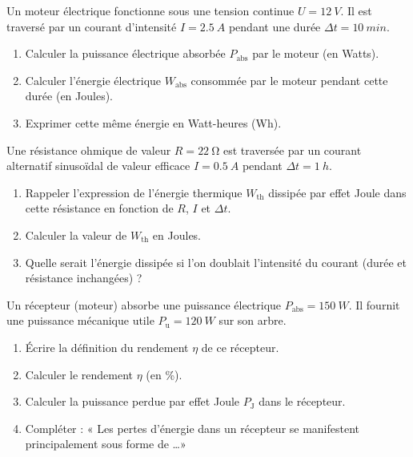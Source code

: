 \documentclass[11pt]{article}
\begin{document}
\begin{exercice}
Un moteur électrique fonctionne sous une tension continue $U = \SI{12}{V}$. Il est traversé par un courant d'intensité $I = \SI{2,5}{A}$ pendant une durée $\Delta t = \SI{10}{min}$.
\begin{enumerate}
    \item Calculer la puissance électrique absorbée $P_{\text{abs}}$ par le moteur (en Watts).
    \item Calculer l'énergie électrique $W_{\text{abs}}$ consommée par le moteur pendant cette durée (en Joules).
    \item Exprimer cette même énergie en Watt-heures (Wh).
\end{enumerate}
\end{exercice}

\begin{exercice}
Une résistance ohmique de valeur $R = \SI{22}{\ohm}$ est traversée par un courant alternatif sinusoïdal de valeur efficace $I = \SI{0,5}{A}$ pendant $\Delta t = \SI{1}{h}$.
\begin{enumerate}
    \item Rappeler l'expression de l'énergie thermique $W_{\text{th}}$ dissipée par effet Joule dans cette résistance en fonction de $R$, $I$ et $\Delta t$.
    \item Calculer la valeur de $W_{\text{th}}$ en Joules.
    \item Quelle serait l'énergie dissipée si l'on doublait l'intensité du courant (durée et résistance inchangées) ?
\end{enumerate}
\end{exercice}

\begin{exercice}
Un récepteur (moteur) absorbe une puissance électrique $P_{\text{abs}} = \SI{150}{W}$. Il fournit une puissance mécanique utile $P_{\text{u}} = \SI{120}{W}$ sur son arbre.
\begin{enumerate}
    \item Écrire la définition du rendement $\eta$ de ce récepteur.
    \item Calculer le rendement $\eta$ (en \%). 
    \item Calculer la puissance perdue par effet Joule $P_{\text{J}}$ dans le récepteur.
    \item Compléter : « Les pertes d'énergie dans un récepteur se manifestent principalement sous forme de \ldots »
\end{enumerate}
\end{exercice}
\end{document}
